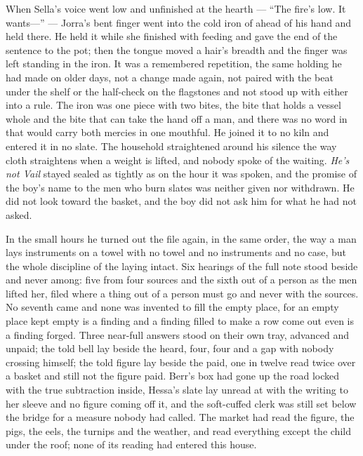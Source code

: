 When Sella's voice went low and unfinished at the hearth --- “The fire's low. It wants---” --- Jorra's bent finger went into the cold iron of  ahead of his hand and held there. He held it while she finished with feeding and gave the end of the sentence to the pot; then the tongue moved a hair's breadth and the finger was left standing in the iron. It was a remembered repetition, the same holding he had made on older days, not a change made again, not paired with the beat under the shelf or the half-check on the flagstones and not stood up with either into a rule. The iron was one piece with two bites, the bite that holds a vessel whole and the bite that can take the hand off a man, and there was no word in  that would carry both mercies in one mouthful. He joined it to no kiln and entered it in no slate. The household straightened around his silence the way cloth straightens when a weight is lifted, and nobody spoke of the waiting. \emph{He's not Vail} stayed sealed as tightly as on the hour it was spoken, and the promise of the boy's name to the men who burn slates was neither given nor withdrawn. He did not look toward the basket, and the boy did not ask him for what he had not asked.

\scenebreak

In the small hours he turned out the file again, in the same order, the way a man lays instruments on a towel with no towel and no instruments and no case, but the whole discipline of the laying intact. Six hearings of the full note stood beside and never among: five from four sources and the sixth out of a person as the men lifted her, filed where a thing out of a person must go and never with the sources. No seventh came and none was invented to fill the empty place, for an empty place kept empty is a finding and a finding filled to make a row come out even is a finding forged. Three near-full answers stood on their own tray, advanced and unpaid; the told bell lay beside the heard, four, four and a gap with nobody crossing himself; the told figure lay beside the paid, one in twelve read twice over a basket and still not the figure paid. Berr's box had gone up the road locked with the true subtraction inside, Hessa's slate lay unread at  with the writing to her sleeve and no figure coming off it, and the soft-cuffed clerk was still set below the bridge for a measure nobody had called. The market had read the figure, the pigs, the eels, the turnips and the weather, and read everything except the child under the roof; none of its reading had entered this house.

